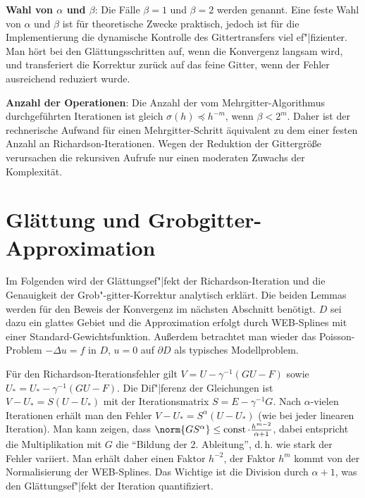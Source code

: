 \linie

\textbf{Wahl von $\alpha$ und $\beta$}:
Die Fälle $\beta = 1$ und $\beta = 2$ werden  genannt.
Eine feste Wahl von $\alpha$ und $\beta$ ist für theoretische Zwecke praktisch,
jedoch ist für die Implementierung die dynamische Kontrolle des Gittertransfers viel ef"|fizienter.
Man hört bei den Glättungsschritten auf, wenn die Konvergenz langsam wird, und
transferiert die Korrektur zurück auf das feine Gitter, wenn der Fehler ausreichend
reduziert wurde.

\linie

\textbf{Anzahl der Operationen}:
Die Anzahl der vom Mehrgitter-Algorithmus durchgeführten Iterationen ist gleich
$\sigma(h) \preceq h^{-m}$, wenn $\beta < 2^m$.
Daher ist der rechnerische Aufwand für einen Mehrgitter-Schritt äquivalent zu dem einer festen
Anzahl an Richardson-Iterationen.
Wegen der Reduktion der Gittergröße verursachen die rekursiven Aufrufe nur einen moderaten
Zuwachs der Komplexität.

\section{%
    Glättung und Grobgitter-Approximation%
}

Im Folgenden wird der Glättungsef"|fekt der Richardson-Iteration und die Genauigkeit der
Grob"-gitter-Korrektur analytisch erklärt.
Die beiden Lemmas werden für den Beweis der Konvergenz im nächsten Abschnitt benötigt.
$D$ sei dazu ein glattes Gebiet und die Approximation erfolgt durch WEB-Splines mit einer
Standard-Gewichtsfunktion.
Außerdem betrachtet man wieder das Poisson-Problem $-\Delta u = f$ in $D$,
$u = 0$ auf $\partial D$ als typisches Modellproblem.

Für den Richardson-Iterationsfehler gilt
$V = U - \gamma^{-1} (GU - F)$ sowie $U_\ast = U_\ast - \gamma^{-1} (GU - F)$.
Die Dif"|ferenz der Gleichungen ist $V - U_\ast = S(U - U_\ast)$ mit
der Iterationsmatrix $S = E - \gamma^{-1} G$.
Nach $\alpha$-vielen Iterationen erhält man den Fehler
$V - U_\ast = S^\alpha (U - U_\ast)$
(wie bei jeder linearen Iteration).
Man kann zeigen, dass $\norm{GS^\alpha} \le \const \cdot \frac{h^{m-2}}{\alpha+1}$,
dabei entspricht die Multiplikation mit $G$ die "`Bildung der 2. Ableitung"',
d.\,h. wie stark der Fehler variiert.
Man erhält daher einen Faktor $h^{-2}$,
der Faktor $h^m$ kommt von der Normalisierung der WEB-Splines.
Das Wichtige ist die Division durch $\alpha + 1$, was den Glättungsef"|fekt der Iteration
quantifiziert.


